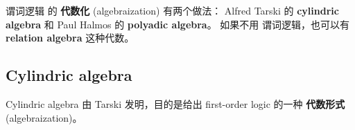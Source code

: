 	\section{}

谓词逻辑 的 \textbf{代数化} (algebraization) 有两个做法： Alfred Tarski 的 \textbf{cylindric algebra} 和 Paul Halmos 的 \textbf{polyadic algebra}。  如果不用 谓词逻辑，也可以有 \textbf{relation algebra} 这种代数。 

\subsection{Cylindric algebra}

Cylindric algebra 由 Tarski 发明，目的是给出 first-order logic 的一种 \textbf{代数形式} (algebraization)。 

